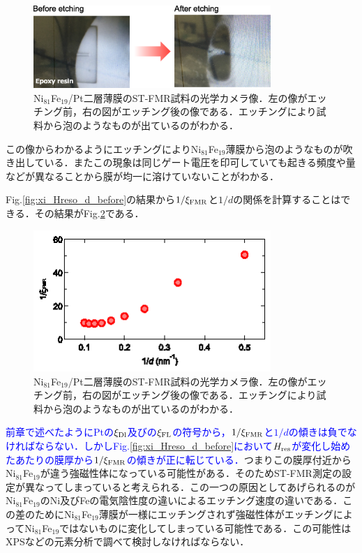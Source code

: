 \begin{figure}[htbp]
\centerline{
\includegraphics[width=9cm]{images/picture_before.eps}
}
\caption{Ni$_{81}$Fe$_{19}$/Pt二層薄膜のST-FMR試料の光学カメラ像．左の像がエッチング前，右の図がエッチング後の像である．エッチングにより試料から泡のようなものが出ているのがわかる．
}
\label{fig:picture_before}
\end{figure}

この像からわかるようにエッチングによりNi$_{81}$Fe$_{19}$薄膜から泡のようなものが吹き出している．またこの現象は同じゲート電圧を印可していても起きる頻度や量などが異なることから膜が均一に溶けていないことがわかる．

Fig.\ref{fig:xi_Hreso_d_before}の結果から$1/\xi_{\rm FMR}$と$1/d$の関係を計算することはできる．その結果がFig.\ref{fig:xi-1_before}である．

\begin{figure}[htbp]
\centerline{
\includegraphics[width=9cm]{images/xi-1_before.eps}
}
\caption{Ni$_{81}$Fe$_{19}$/Pt二層薄膜のST-FMR試料の光学カメラ像．左の像がエッチング前，右の図がエッチング後の像である．エッチングにより試料から泡のようなものが出ているのがわかる．
}
\label{fig:xi-1_before}
\end{figure}

\textcolor{blue}{前章で述べたようにPtの$\xi_{\rm Dl}$及びの$\xi_{\rm FL}$の符号から，$1/\xi_{\rm FMR}$と$1/d$の傾きは負でなければならない．しかしFig.\ref{fig:xi_Hreso_d_before}において$H_{\rm res}$が変化し始めたあたりの膜厚から$1/\xi_{\rm FMR}$の傾きが正に転じている．}つまりこの膜厚付近からNi$_{81}$Fe$_{19}$が違う強磁性体になっている可能性がある．そのためST-FMR測定の設定が異なってしまっていると考えられる．この一つの原因としてあげられるのがNi$_{81}$Fe$_{19}$のNi及びFeの電気陰性度の違いによるエッチング速度の違いである．この差のためにNi$_{81}$Fe$_{19}$薄膜が一様にエッチングされず強磁性体がエッチングによってNi$_{81}$Fe$_{19}$ではないものに変化してしまっている可能性である．この可能性はXPSなどの元素分析で調べて検討しなければならない．\\

